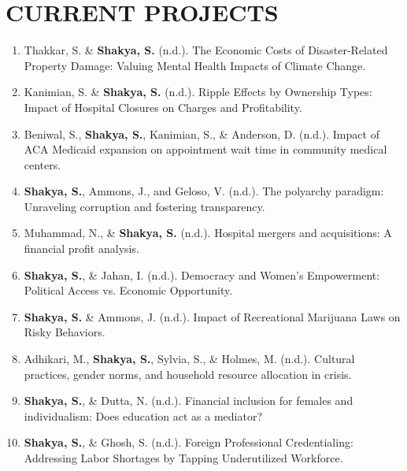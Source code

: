 \section*{CURRENT PROJECTS}
\begin{enumerate}
\item Thakkar, S. \& \textbf{Shakya, S.} (n.d.). The Economic Costs of Disaster-Related Property Damage: Valuing Mental Health Impacts of Climate Change.
\item Kanimian, S. \& \textbf{Shakya, S.} (n.d.). Ripple Effects by Ownership Types: Impact of Hospital Closures on Charges and Profitability.
\item Beniwal, S., \textbf{Shakya, S.}, Kanimian, S., \& Anderson, D. (n.d.). Impact of ACA Medicaid expansion on appointment wait time in community medical centers.
\item \textbf{Shakya, S.}, Ammons, J., and Geloso, V. (n.d.). The polyarchy paradigm: Unraveling corruption and fostering transparency.
\item Muhammad, N., \& \textbf{Shakya, S.} (n.d.). Hospital mergers and acquisitions: A financial profit analysis.
\item \textbf{Shakya, S.}, \& Jahan, I. (n.d.). Democracy and Women's Empowerment: Political Access vs. Economic Opportunity.
\item \textbf{Shakya, S.} \& Ammons, J. (n.d.). Impact of Recreational Marijuana Laws on Risky Behaviors.
\item Adhikari, M., \textbf{Shakya, S.}, Sylvia, S., \& Holmes, M. (n.d.). Cultural practices, gender norms, and household resource allocation in crisis.
\item \textbf{Shakya, S.}, \& Dutta, N. (n.d.). Financial inclusion for females and individualism: Does education act as a mediator?
\item \textbf{Shakya, S.}, \& Ghosh, S. (n.d.). Foreign Professional Credentialing: Addressing Labor Shortages by Tapping Underutilized Workforce.
\end{enumerate}

